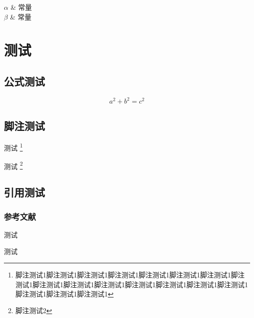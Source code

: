 \documentclass[type = doctor]{whu-thesis}
\begin{document}
\begin{abstract}
  \zhlipsum[1]
\end{abstract}

\begin{abstract*}
  \lipsum[1]
\end{abstract*}

\tableofcontents


\begin{notation}
  $\alpha$ & 常量 \\
  $\beta$ & 常量 \\
\end{notation}



\mainmatter

\chapter{测试}

\section{公式测试}

\begin{equation}
  a^2 + b^2 = c^2
\end{equation}



\section{脚注测试}

测试 \footnote{脚注测试1脚注测试1脚注测试1脚注测试1脚注测试1脚注测试1脚注测试1脚注测试1脚注测试1脚注测试1脚注测试1脚注测试1脚注测试1脚注测试1脚注测试1脚注测试1脚注测试1脚注测试1}

测试 \footnote{脚注测试2}



\section{引用测试}

\subsection{参考文献}

测试%

测试%
\end{document}

